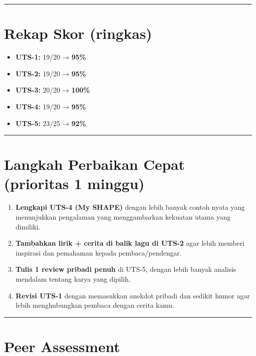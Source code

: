 \documentclass[
  letterpaper,
  DIV=11,
  numbers=noendperiod]{scrreprt}
\providecommand{\tightlist}{%
  \setlength{\itemsep}{0pt}\setlength{\parskip}{0pt}}
\begin{document}
\begin{center}\rule{0.5\linewidth}{0.5pt}\end{center}

\section{Rekap Skor (ringkas)}\label{rekap-skor-ringkas}

\begin{itemize}
\tightlist
\item
  \textbf{UTS-1:} 19/20 → \textbf{95\%}
\item
  \textbf{UTS-2:} 19/20 → \textbf{95\%}
\item
  \textbf{UTS-3:} 20/20 → \textbf{100\%}
\item
  \textbf{UTS-4:} 19/20 → \textbf{95\%}
\item
  \textbf{UTS-5:} 23/25 → \textbf{92\%}
\end{itemize}

\begin{center}\rule{0.5\linewidth}{0.5pt}\end{center}

\section{Langkah Perbaikan Cepat (prioritas 1
minggu)}\label{langkah-perbaikan-cepat-prioritas-1-minggu}

\begin{enumerate}
\def\labelenumi{\arabic{enumi}.}
\tightlist
\item
  \textbf{Lengkapi UTS-4 (My SHAPE)} dengan lebih banyak contoh nyata
  yang menunjukkan pengalaman yang menggambarkan kekuatan utama yang
  dimiliki.
\item
  \textbf{Tambahkan lirik + cerita di balik lagu di UTS-2} agar lebih
  memberi inspirasi dan pemahaman kepada pembaca/pendengar.
\item
  \textbf{Tulis 1 review pribadi penuh} di UTS-5, dengan lebih banyak
  analisis mendalam tentang karya yang dipilih.
\item
  \textbf{Revisi UTS-1} dengan memasukkan anekdot pribadi dan sedikit
  humor agar lebih menghubungkan pembaca dengan cerita kamu.
\end{enumerate}

\begin{center}\rule{0.5\linewidth}{0.5pt}\end{center}

\section{Peer Assessment}\label{peer-assessment}
\end{document}
